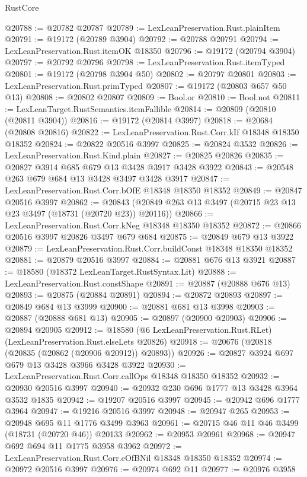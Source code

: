 \begin{lexlean}{RustCore}
\begin{coremodule}
@20788 := @20782 @20787
@20789 := LexLeanPreservation.Rust.plainItem
@20791 := @19172 (@20789 @3904)
@20792 := @20788 @20791
@20794 := LexLeanPreservation.Rust.itemOK @18350
@20796 := @19172 (@20794 @3904)
@20797 := @20792 @20796
@20798 := LexLeanPreservation.Rust.itemTyped
@20801 := @19172 (@20798 @3904 @50)
@20802 := @20797 @20801
@20803 := LexLeanPreservation.Rust.primTyped
@20807 := @19172 (@20803 @657 @50 @13)
@20808 := @20802 @20807
@20809 := Bool.or
@20810 := Bool.not
@20811 := LexLeanTarget.RustSemantics.itemFallible
@20814 := @20809 (@20810 (@20811 @3904))
@20816 := @19172 (@20814 @3997)
@20818 := @20684 (@20808 @20816)
@20822 := LexLeanPreservation.Rust.Corr.kIf @18348 @18350 @18352
@20824 := @20822 @20516 @3997
@20825 := @20824 @3532
@20826 := LexLeanPreservation.Rust.Kind.plain
@20827 := @20825 @20826
@20835 := @20827 @3914 @685 @679 @13 @3428 @3917 @3428 @3922
@20843 := @20548 @263 @679 @684 @13 @3428 @3497 @3428 @3917
@20847 := LexLeanPreservation.Rust.Corr.bOfE @18348 @18350 @18352
@20849 := @20847 @20516 @3997
@20862 := @20843 (@20849 @263 @13 @3497 (@20715 @23 @13 @23 @3497 (@18731 (@20720 @23)) @20116))
@20866 := LexLeanPreservation.Rust.Corr.kNeg @18348 @18350 @18352
@20872 := @20866 @20516 @3997 @20826 @3497 @679 @684
@20875 := @20849 @679 @13 @3922
@20879 := LexLeanPreservation.Rust.Corr.buildConst @18348 @18350 @18352
@20881 := @20879 @20516 @3997
@20884 := @20881 @676 @13 @3921
@20887 := @18580 (@18372 LexLeanTarget.RustSyntax.Lit)
@20888 := LexLeanPreservation.Rust.constShape
@20891 := @20887 (@20888 @676 @13)
@20893 := @20875 (@20884 @20891)
@20894 := @20872 @20893
@20897 := @20849 @684 @13 @3999
@20900 := @20881 @681 @13 @3998
@20903 := @20887 (@20888 @681 @13)
@20905 := @20897 (@20900 @20903)
@20906 := @20894 @20905
@20912 := @18580 (@6 LexLeanPreservation.Rust.RLet) (LexLeanPreservation.Rust.elseLets @20826)
@20918 := @20676 (@20818 (@20835 (@20862 (@20906 @20912)) @20893))
@20926 := @20827 @3924 @697 @679 @13 @3428 @3966 @3428 @3922
@20930 := LexLeanPreservation.Rust.Corr.callOps @18348 @18350 @18352
@20932 := @20930 @20516 @3997
@20940 := @20932 @230 @696 @1777 @13 @3428 @3964 @3532 @1835
@20942 := @19207 @20516 @3997
@20945 := @20942 @696 @1777 @3964
@20947 := @19216 @20516 @3997
@20948 := @20947 @265
@20953 := @20948 @695 @11 @1776 @3499 @3963
@20961 := @20715 @46 @11 @46 @3499 (@18731 (@20720 @46)) @20133
@20962 := @20953 @20961
@20968 := @20947 @692 @694 @11 @1775 @3958 @3962
@20972 := LexLeanPreservation.Rust.Corr.eOfBNil @18348 @18350 @18352
@20974 := @20972 @20516 @3997
@20976 := @20974 @692 @11
@20977 := @20976 @3958

\end{coremodule}
\end{lexlean}
